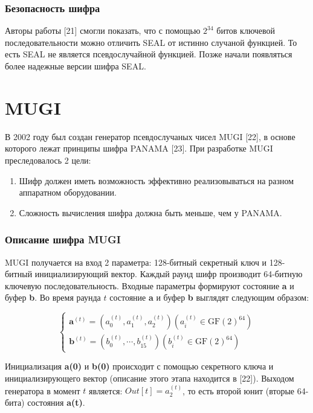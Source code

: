 \documentclass[colorthm]{./civarticle}
\begin{document}
\subsubsection{Безопасность шифра} 

Авторы работы [21] смогли показать, что с помощью $2^{34}$ битов ключевой последовательности можно отличить SEAL от истинно случаной функцией. То есть SEAL не является псевдослучайной функцией. Позже начали появляться более надежные версии шифра SEAL.


\section{MUGI}

В 2002 году был создан генератор псевдослучаных чисел MUGI [22], в основе которого лежат принципы шифра PANAMA [23]. При разработке MUGI преследовалось 2 цели: 

\begin{enumerate}
    \item Шифр должен иметь возможность эффективно реализовываться на разном аппаратном оборудовании. 
    \item Сложность вычисления шифра должна быть меньше, чем у PANAMA.
\end{enumerate}

\subsubsection{Описание шифра MUGI}

MUGI получается на вход 2 параметра: 128-битный секретный ключ и 128-битный инициализирующий вектор. Каждый раунд шифр производит 64-битную ключевую последовательность. Входные параметры формируют состояние \textbf{a} и буфер \textbf{b}. Во время раунда $t$ состояние \textbf{a} и буфер \textbf{b} выглядят следующим образом: 

\begin{equation}
    \left\{\begin{array}{l}
\mathbf{a}^{(t)}=\left(a_0^{(t)}, a_1^{(t)}, a_2^{(t)}\right)\left(a_i^{(t)} \in \mathrm{GF}(2)^{64}\right) \\
\mathbf{b}^{(t)}=\left(b_0^{(t)}, \cdots, b_{15}^{(t)}\right)\left(b_i^{(t)} \in \mathrm{GF}(2)^{64}\right)
\end{array}\right.
\end{equation}

Инициализация \textbf{a(0)} и \textbf{b(0)} происходит с помощью секретного ключа и инициализирующего вектор (описание этого этапа находится в [22]). Выходом генератора в момент $t$ является: $Out[t] = a_2^(t)$, то есть второй юнит (вторые 64-бита) состояния \textbf{a(t)}.
\end{document}
